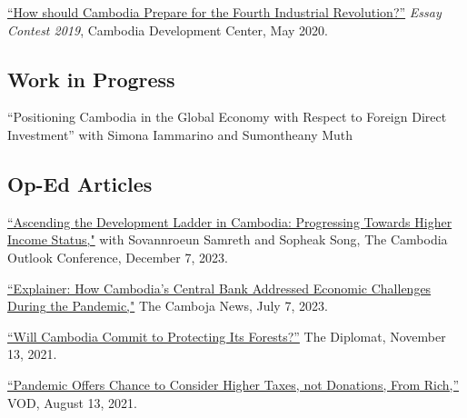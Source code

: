 \documentclass[10pt,a4paper]{article}
\begin{document}
		\href{https://cd-center.org/en/essay-contest-2019-first-place-winner/}{``How should Cambodia Prepare for the Fourth Industrial Revolution?''} \textit{Essay Contest 2019}, Cambodia Development Center, May 2020.

\subsection*{Work in Progress}
	
	``Positioning Cambodia in the Global Economy with Respect to Foreign Direct Investment'' with Simona Iammarino and Sumontheany Muth

\subsection*{Op-Ed Articles}

	
	\href{https://coc2023.cdri.org.kh/ascending-the-development-ladder-in-cambodia-progressing-towards-higher-income-status/}{``Ascending the Development Ladder in Cambodia: Progressing Towards Higher Income Status,"} with Sovannroeun Samreth and Sopheak Song, The Cambodia Outlook Conference, December 7, 2023. \\ \vspace{-.5em}
	
	\href{https://cambojanews.com/explainer-how-cambodias-central-bank-addressed-economic-challenges-during-the-pandemic/}{``Explainer: How Cambodia's Central Bank Addressed Economic Challenges During the Pandemic,"} The Camboja News, July 7, 2023. \\ \vspace{-.5em}
	
	\href{https://thediplomat.com/2021/11/will-cambodia-commit-to-protecting-its-forests/}{``Will Cambodia Commit to Protecting Its Forests?''} The Diplomat, November 13, 2021.\\ \vspace{-.5em}

	\href{https://vodenglish.news/opinion-pandemic-offers-chance-to-consider-higher-taxes-not-donations-from-rich/}{``Pandemic Offers Chance to Consider Higher Taxes, not Donations, From Rich,''} VOD, August 13, 2021.\\ \vspace{-.5em}
\end{document}
